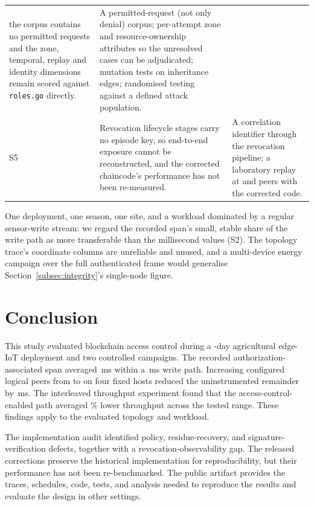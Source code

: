 \documentclass[a4paper,fleqn]{cas-sc}
\begin{document}
\begin{table}[pos=t]
\begin{tabularx}{\columnwidth}{@{}p{}Xp{}@{}}
     the corpus contains no permitted requests and the zone, temporal,
     replay and identity dimensions remain scored against
     \texttt{roles.go} directly. &
     A permitted-request (not only denial) corpus; per-attempt zone and
     resource-ownership attributes so the unresolved cases can be
     adjudicated; mutation tests on inheritance edges; randomised testing
     against a defined attack population. \\
S5 & Revocation lifecycle stages carry no episode key, so end-to-end
     exposure cannot be reconstructed, and the corrected chaincode's
     performance has not been re-measured. &
     A correlation identifier through the revocation pipeline; a
     laboratory replay at \ScaleMinPeers{} and \ScaleMaxPeers{} peers with
     the corrected code. \\
\bottomrule
\end{tabularx}
\end{table}

One deployment, one season, one site, and a workload dominated by a
regular sensor-write stream: we regard the recorded span's small, stable
share of the write path as more transferable than the millisecond values
(S2). The topology trace's coordinate columns are unreliable and unused,
and a multi-device energy campaign over the full authenticated frame would
generalise Section~\ref{subsec:integrity}'s single-node figure.

\FloatBarrier
\section{Conclusion}
\label{sec:conclusion}

This study evaluated blockchain access control during a \DeployDays-day
agricultural edge-IoT deployment and two controlled campaigns. The recorded
authorization-associated span averaged \PartAccess\,ms within a
\PartTotal\,ms write path. Increasing configured logical peers from
\ScaleMinPeers{} to \ScaleMaxPeers{} on four fixed hosts reduced the
uninstrumented remainder by \PartEndorser\,ms. The interleaved throughput
experiment found that the access-control-enabled path averaged
\OverheadMeanPct\% lower throughput across the tested range. These findings
apply to the evaluated topology and workload.

The implementation audit identified policy, residue-recovery, and
signature-verification defects, together with a revocation-observability
gap. The released corrections preserve the historical implementation for
reproducibility, but their performance has not been re-benchmarked. The
public artifact provides the traces, schedules, code, tests, and analysis
needed to reproduce the results and evaluate the design in other settings.
\end{document}
